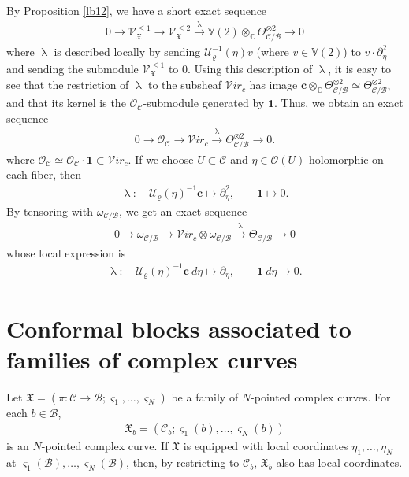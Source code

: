 \documentclass[11pt,b5paper,notitlepage]{article}
\theoremstyle{definition}
\theoremstyle{plain}
\newcommand{\fk}{\mathfrak}
\newcommand{\mc}{\mathcal}
\newcommand{\id}{\mathbf{1}}
\newcommand{\scr}{\mathscr}
\newcommand{\sgm}{\varsigma}
\newcommand{\Vbb}{\mathbb V}
\newcommand{\Cbb}{\mathbb C}
\newcommand{\cbf}{\mathbf c}
\newcommand{\svir}{\mathcal V\!\mathit{ir}}
\numberwithin{equation}{section}
\begin{document}
By Proposition \ref{lb12}, we have a short exact sequence
\begin{align*}
0\rightarrow\scr V_{\fk X}^{\leq 1} \rightarrow\scr V_{\fk X}^{\leq 2}\xrightarrow{\uplambda}\Vbb(2)\otimes_\Cbb\Theta_{\mc C/\mc B}^{\otimes 2}\rightarrow 0
\end{align*}
where $\uplambda$ is described locally  by sending  $\mc U_\varrho^{-1}(\eta)v$ (where $v\in\Vbb(2)$) to  $v\cdot \partial_\eta^2$ and sending the submodule $\scr V_{\fk X}^{\leq 1}$ to $0$. Using this description of $\uplambda$, it is easy to see that the restriction of $\uplambda$ to the subsheaf $\svir_c$ has image $\cbf\otimes_\Cbb \Theta_{\mc C/\mc B}^{\otimes 2}\simeq \Theta_{\mc C/\mc B}^{\otimes 2}$, and that its kernel is the $\scr O_{\mc C}$-submodule generated by $\id$. Thus, we obtain an exact sequence
\begin{align}
0\rightarrow\scr O_{\mc C} \rightarrow\svir_c\xrightarrow{\uplambda}\Theta_{\mc C/\mc B}^{\otimes 2}\rightarrow 0.
\end{align}
where $\scr O_{\mc C}\simeq\scr O_{\mc C}\cdot\id\subset\svir_c$. If we choose $U\subset\mc C$ and $\eta\in\scr O(U)$ holomorphic on each fiber,  then
\begin{gather*}
\uplambda:\quad \mc U_\varrho(\eta)^{-1}\cbf\mapsto \partial_\eta^2,\qquad \id\mapsto 0.
\end{gather*}
By tensoring with $\omega_{\mc C/\mc B}$, we get an exact sequence
\begin{gather}
0\rightarrow\omega_{\mc C/\mc B} \rightarrow\svir_c\otimes \omega_{\mc C/\mc B}\xrightarrow{\uplambda} \Theta_{\mc C/\mc B}\rightarrow 0\label{eq53}
\end{gather}
whose local expression is
\begin{gather}
\uplambda:\quad \mc U_\varrho(\eta)^{-1}\cbf ~d\eta\mapsto \partial_\eta,\qquad \id ~d\eta\mapsto 0.
\end{gather}







\section{Conformal blocks associated to families of complex curves}\label{lb28}


Let $\fk X=(\pi:\mc C\rightarrow\mc B;\sgm_1,\dots,\sgm_N)$ be a family of $N$-pointed complex curves. For each $b\in\mc B$, \index{Xb@$\fk X_b$} 
\begin{align*}
\fk X_b=(\mc C_b;\sgm_1(b),\dots,\sgm_N(b))
\end{align*}
is an $N$-pointed complex curve. If $\fk X$ is equipped with local coordinates $\eta_1,\dots,\eta_N$ at $\sgm_1(\mc B),\dots,\sgm_N(\mc B)$, then, by restricting to $\mc C_b$, $\fk X_b$ also has local coordinates.
\end{document}
